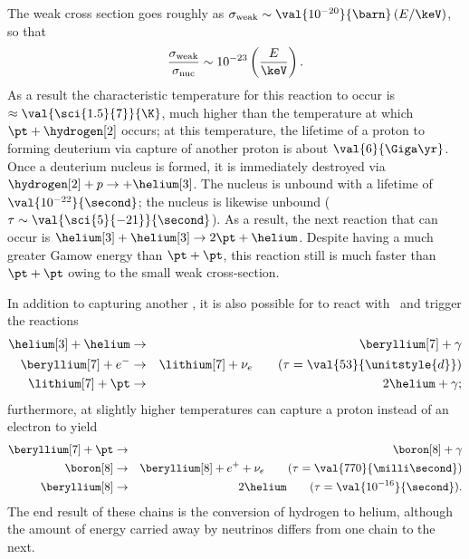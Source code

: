 The weak cross section goes roughly as $\sigma_{\mathrm{weak}} \sim \val{10^{-20}}{\barn}\left(E/\keV\right)$, so that
\[ \frac{\sigma_{\mathrm{weak}}}{\sigma_{\mathrm{nuc}}} \sim 10^{-23}\left(\frac{E}{\keV}\right). \]
As a result the characteristic temperature for this reaction to occur is $\approx \val{\sci{1.5}{7}}{\K}$, much higher than the temperature at which $\pt+\hydrogen[2]$ occurs; at this temperature, the lifetime of a proton to forming deuterium via capture of another proton is about $\val{6}{\Giga\yr}$.
Once a deuterium nucleus is formed, it is immediately destroyed via $\hydrogen[2]+p\to+\helium[3]$. The nucleus \lithium[4] is unbound with a lifetime of $\val{10^{-22}}{\second}$; the nucleus \beryllium[6] is likewise unbound ($\tau \sim \val{\sci{5}{-21}}{\second}$). As a result, the next reaction that can occur is $\helium[3]+\helium[3]\to 2\pt+\helium$. Despite having a much greater Gamow energy than $\pt + \pt$, this reaction still is much faster than $\pt+\pt$ owing to the small weak cross-section.

In addition to capturing another \helium[3], it is also possible for \helium[3] to react with \helium\ and trigger the reactions
\begin{eqnarray}
\helium[3] + \helium &\to& \beryllium[7] + \gamma\nonumber\\
 \beryllium[7] + e^{-} &\to& \lithium[7] +  \nu_{e}\qquad(\tau=\val{53}{\unitstyle{d}})\nonumber \\
 \lithium[7] + \pt &\to& 2\helium + \gamma;
\label{e.pp-2}
\end{eqnarray}
furthermore, at slightly higher temperatures \beryllium[7] can capture a proton instead of an electron to yield
\begin{eqnarray}
\beryllium[7] + \pt &\to& \boron[8] + \gamma\nonumber\\
\boron[8] &\to& \beryllium[8] + e^{+} + \nu_{e}\qquad(\tau = \val{770}{\milli\second})\nonumber\\
\beryllium[8] &\to& 2\helium\qquad(\tau= \val{10^{-16}}{\second}).
\label{e.pp-3}
\end{eqnarray}
The end result of these chains is the conversion of hydrogen to helium, although the amount of energy carried away by neutrinos differs from one chain to the next.

